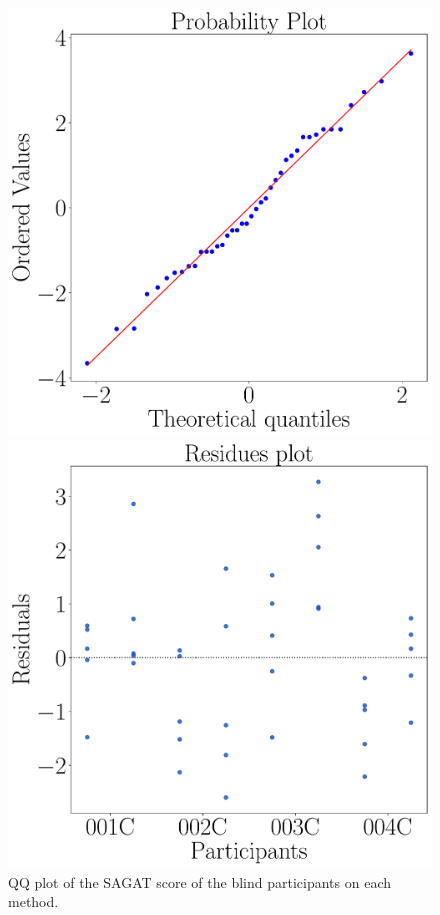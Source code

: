 \begin{figure}[!htb]
    \centering
    \begin{minipage}{0.45\textwidth}
        \centering
        \includegraphics[width = \textwidth]{Resultados/Sagat/Figuras/pdf/qqplot_sagat_avg_two_way_blind.pdf}
        \caption{QQ plot of the SAGAT score of the blind participants on each method.}
        \label{fig:qqplot_sagat_avg_two_way_blind}
    \end{minipage}
    \begin{minipage}{0.075\textwidth}
        \hfill
    \end{minipage}
    \begin{minipage}{0.45\textwidth}
        \centering
        \includegraphics[width = \textwidth]{Resultados/Sagat/Figuras/pdf/residplot_sagat_avg_two_way_blind.pdf}

\end{minipage}
\end{figure}

